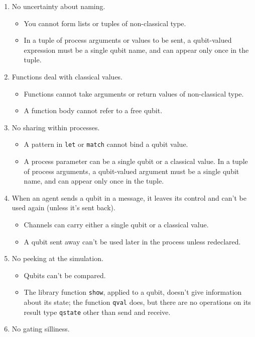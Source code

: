 \documentclass[11pt,a4paper]{article}
\newcommand{\verbtt}[1]{\texttt{\small{}#1}}
\begin{document}
\begin{enumerate}
\item No uncertainty about naming.
\begin{itemize}
\item You cannot form lists or tuples of non-classical type. 
\item In a tuple of process arguments or values to be sent, a qubit-valued expression must be a single qubit name, and can appear only once in the tuple.
\end{itemize}
\item Functions deal with classical values.
\begin{itemize}
\item Functions cannot take arguments or return values of non-classical type.
\item A function body cannot refer to a free qubit.
\end{itemize}
\item No sharing within processes.
\begin{itemize}
\item A pattern in \verbtt{let} or \verbtt{match} cannot bind a qubit value.
\item A process parameter can be a single qubit or a classical value. In a tuple of process arguments, a qubit-valued argument must be a single qubit name, and can appear only once in the tuple.
\end{itemize}
\item When an agent sends a qubit in a message, it leaves its control and can't be used again (unless it's sent back). 
\begin{itemize}
\item Channels can carry either a single qubit or a classical value.
\item A qubit sent away can't be used later in the process unless redeclared.
\end{itemize}
\item No peeking at the simulation.
\begin{itemize}
\item Qubits can't be compared.
\item The library function \verbtt{show}, applied to a qubit, doesn't give information about its state; the function \verbtt{qval} does, but there are no operations on its result type \verbtt{qstate} other than send and receive.
\end{itemize}
\item No gating silliness.
\begin{itemize}

\end{itemize}
\end{enumerate}
\end{document}
